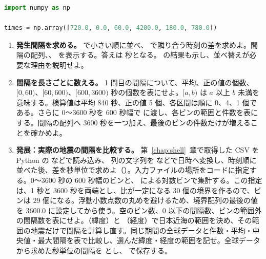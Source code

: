 \begin{lstlisting}[language=Python]
import numpy as np

times = np.array([720.0, 0.0, 60.0, 4200.0, 180.0, 780.0])
\end{lstlisting}

\begin{enumerate}
\item \textbf{発生間隔を求める。}
 で小さい順に並べ、 で隣り合う時刻の差を求めよ。間隔の配列、、 を表示する。答えは \code{[60., 120., 540., 60., 3420.]} 秒となる。 の結果も示し、並べ替えが必要な理由を説明せよ。

\item \textbf{間隔を長さごとに数える。}
1 問目の間隔について、平均、正の値の個数、\([0,60)\)、\([60,600)\)、\([600,3600)\) 秒の個数を表にせよ。\([a,b)\) は \(a\) 以上 \(b\) 未満を意味する。検算値は平均 840 秒、正の値 5 個、各区間は順に 0、4、1 個である。さらに 0～3600 秒を 600 秒幅で  に渡し、各ビンの範囲と件数を表にする。間隔の配列へ 3600 秒を一つ加え、最後のビンの件数だけが増えることを確かめよ。

\item \textbf{発展：実際の地震の間隔を比較する。}
第~\ref{chap:shell}~章で取得した CSV を Python の  などで読み込み、 列の文字列を  などで日時へ変換し、時刻順に並べた後、差を秒単位で求めよ（）。入力ファイルの場所をコードに指定する。0～3600 秒の 600 秒幅のビンと、 による対数ビンで集計する。この指定は、1 秒と 3600 秒を両端とし、比が一定になる 30 個の境界を作るので、ビンは 29 個になる。浮動小数点数の丸めを避けるため、境界配列の最後の値を 3600.0 に設定してから使う。空のビン数、0 以下の間隔数、ビンの範囲外の間隔数を表にせよ。（緯度）と （経度）で日本近海の範囲を決め、その範囲の地震だけで間隔を計算し直す。同じ期間の全球データと件数・平均・中央値・最大間隔を表で比較し、選んだ緯度・経度の範囲を記せ。全球データから求めた秒単位の間隔を  とし、 で保存する。

\end{enumerate}
